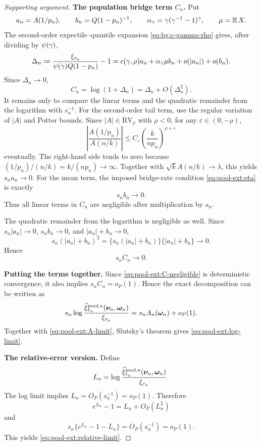 \begin{proof}[Supporting argument]
\smallskip
\noindent\textbf{The population bridge term \(C_n\).}
Put
\[
  a_n=A(1/p_n),
  \qquad
  b_n=Q(1-p_n)^{-1},
  \qquad
  \alpha_\gamma=\gamma(\gamma^{-1}-1)^\gamma,
  \qquad
  \mu=\operatorname{\mathbb{E}} X.
\]
The second-order expectile--quantile expansion
\eqref{eq:bg:c-gamma-rho} gives, after dividing by \(\psi(\gamma)\),
\[
  \Delta_n
  \coloneqq
  \frac{\xi_{\tau_n}}{\psi(\gamma)Q(1-p_n)}-1
  =
  c(\gamma,\rho)a_n+\alpha_\gamma\mu b_n
  +o(|a_n|)+o(b_n).
\]
Since \(\Delta_n\to0\),
\[
  C_n=\log(1+\Delta_n)=\Delta_n+O(\Delta_n^2).
\]
It remains only to compare the linear terms and the quadratic remainder from
the logarithm with \(s_n^{-1}\). For the second-order tail term, use the
regular variation of \(|A|\) and Potter bounds. Since \(|A|\in\mathrm{RV}_\rho\)
with \(\rho<0\), for any \(\varepsilon\in(0,-\rho)\),
\[
  \left|
  \frac{A(1/p_n)}{A(n/k)}
  \right|
  \le
  C_\varepsilon
  \left(\frac{k}{np_n}\right)^{\rho+\varepsilon}
\]
eventually. The right-hand side tends to zero because
\((1/p_n)/(n/k)=k/(np_n)\to\infty\). Together with
\(\sqrt{k}A(n/k)\to\lambda\), this yields \(s_n a_n\to0\).
For the mean term, the imposed bridge-rate condition \eqref{eq:pool-ext:eta}
is exactly
\[
  s_n b_n\to0.
\]
Thus all linear terms in \(C_n\) are negligible after multiplication by
\(s_n\).

The quadratic remainder from the logarithm is negligible as well. Since
\(s_n|a_n|\to0\), \(s_n b_n\to0\), and \(|a_n|+b_n\to0\),
\[
  s_n(|a_n|+b_n)^2
  =
  \{s_n(|a_n|+b_n)\}\{|a_n|+b_n\}
  \to0.
\]
Hence
\begin{equation}
\label{eq:pool-ext:C-negligible}
  s_n C_n\to0.
\end{equation}

\smallskip
\noindent\textbf{Putting the terms together.}
Since \eqref{eq:pool-ext:C-negligible} is deterministic convergence, it also
implies \(s_nC_n=o_P(1)\). Hence the exact decomposition can be written as
\[
  s_n
  \log
  \frac{
    \widehat\xi_{\tau_n}^{\mathrm{pool},\star}(\bm\nu_n,\bm\omega_n)
  }{\xi_{\tau_n}}
  =
  s_nA_n(\bm\omega_n)+o_P(1).
\]
Together with \eqref{eq:pool-ext:A-limit}, Slutsky's theorem gives
\eqref{eq:pool-ext:log-limit}.

\smallskip
\noindent\textbf{The relative-error version.}
Define
\[
  L_n=
  \log
  \frac{
    \widehat\xi_{\tau_n}^{\mathrm{pool},\star}(\bm\nu_n,\bm\omega_n)
  }{\xi_{\tau_n}}.
\]
The log limit implies \(L_n=O_P(s_n^{-1})=o_P(1)\). Therefore
\[
  e^{L_n}-1=L_n+O_P(L_n^2)
\]
and
\[
  s_n\{e^{L_n}-1-L_n\}
  =
  O_P(s_n^{-1})
  =
  o_P(1).
\]
This yields \eqref{eq:pool-ext:relative-limit}.
\end{proof}

